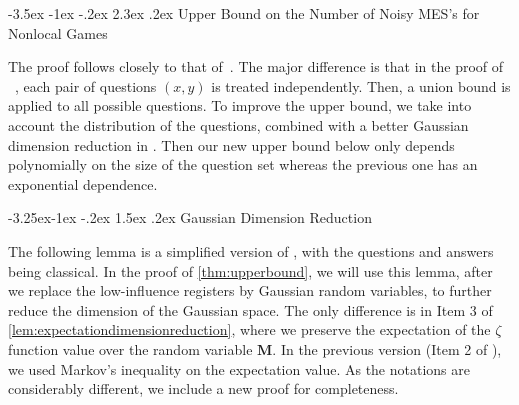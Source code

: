 \documentclass[11pt]{article}
\makeatletter
\renewcommand{\section}{\@startsection {section}{1}{\z@}%
             {-3.5ex \@plus -1ex \@minus -.2ex}%
             {2.3ex \@plus .2ex}%
             {\normalfont\Large\scshape\bfseries}}
\renewcommand{\subsection}{\@startsection{subsection}{2}{\z@}%
             {-3.25ex\@plus -1ex \@minus -.2ex}%
             {1.5ex \@plus .2ex}%
             {\normalfont\large\scshape\bfseries}}
\theoremstyle{plain}
\theoremstyle{definition}
\newcommand{\randM}{\ensuremath{\mathbf{M}}}
\newcommand{\1}{\mathbb{1}} %
\makeatother
\begin{document}
\section{Upper Bound on the Number of Noisy MES's for Nonlocal Games}
\label{sec:upperbound}

The proof follows closely to that of~\cite{qin2021nonlocal}. The major difference is that in the proof of ~\cite{qin2021nonlocal}, each pair of questions $(x,y)$ is treated independently. Then, a union bound is applied to all possible questions. To improve the upper bound, we take into account the distribution of the questions, combined with a better Gaussian dimension reduction in \cite{qin_et_al:LIPIcs.ICALP.2023.97}.
Then
our new upper bound below only depends polynomially on the size of the question set
whereas the previous one has an exponential dependence.


\subsection{Gaussian Dimension Reduction}

The following lemma is a simplified version of \cite[Lemma 5.13]{qin_et_al:LIPIcs.ICALP.2023.97}, with the questions and answers being classical.
In the proof of \cref{thm:upperbound},
we will use this lemma, after we replace the low-influence registers by Gaussian random variables, to further reduce the dimension of the Gaussian space.
The only difference is in Item 3 of \cref{lem:expectationdimensionreduction}, where we preserve the expectation of the $\zeta$ function value over the random variable $\randM$.
In the previous version (Item 2 of \cite[Lemma 5.13]{qin_et_al:LIPIcs.ICALP.2023.97}), we used Markov's inequality on the expectation value.
As the notations are considerably different, we include a new proof for completeness.
\end{document}

